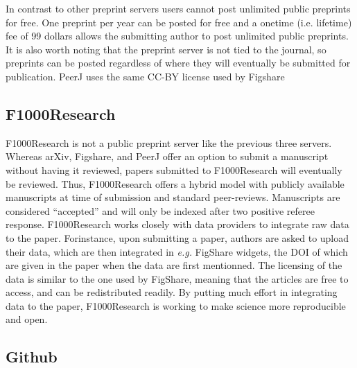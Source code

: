 \documentclass[letterpaper,twocolumn,superscriptaddress,showkeys,longbibliography]{revtex4-1}
\begin{document}
In contrast to other preprint servers users cannot post unlimited public
preprints for free. One preprint per year can be posted for free and a onetime
(i.e. lifetime) fee of 99 dollars allows the submitting author to post unlimited public
preprints. It is also worth noting that the preprint server is not tied to the
journal, so preprints can be posted regardless of where they will eventually be
submitted for publication. PeerJ uses the same CC-BY license used by Figshare

\subsection{F1000Research}

F1000Research is not a public preprint server like the previous three servers.
Whereas arXiv, Figshare, and PeerJ offer an option to submit a manuscript
without having it reviewed, papers submitted to F1000Research will eventually
be reviewed. Thus, F1000Research offers a hybrid model with publicly available
manuscripts at time of submission and standard peer-reviews. Manuscripts are
considered ``accepted'' and will only be indexed after two positive referee
response. F1000Research works closely with data providers to integrate raw
data to the paper. Forinstance, upon submitting a paper, authors are asked to
upload their data, which are then integrated in \emph{e.g.} FigShare widgets,
the DOI of which are given in the paper when the data are first mentionned.
The licensing of the data is similar to the one used by FigShare, meaning that
the articles are free to access, and can be redistributed readily. By putting
much effort in integrating data to the paper, F1000Research is working to make
science more reproducible and open.

\subsection{Github}
\end{document}
